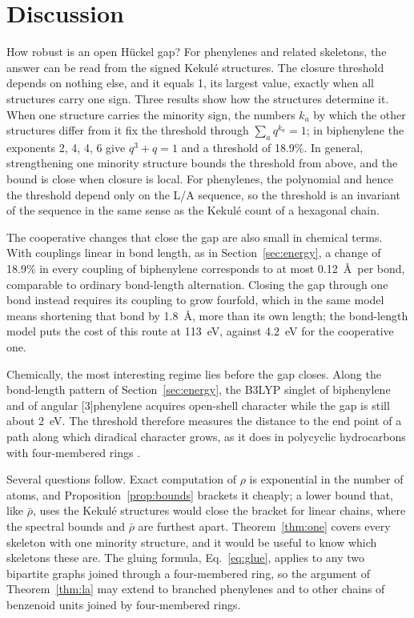 \documentclass[11pt]{article}
\begin{document}
\section{Discussion}

How robust is an open H\"uckel gap? For phenylenes and related skeletons, the answer can be read from the signed Kekul\'e structures. The closure threshold depends on nothing else, and it equals 1, its largest value, exactly when all structures carry one sign. Three results show how the structures determine it. When one structure carries the minority sign, the numbers $k_a$ by which the other structures differ from it fix the threshold through $\sum_aq^{k_a}=1$; in biphenylene the exponents 2, 4, 4, 6 give $q^3+q=1$ and a threshold of 18.9\%. In general, strengthening one minority structure bounds the threshold from above, and the bound is close when closure is local. For phenylenes, the polynomial and hence the threshold depend only on the L/A sequence, so the threshold is an invariant of the sequence in the same sense as the Kekul\'e count of a hexagonal chain.

The cooperative changes that close the gap are also small in chemical terms. With couplings linear in bond length, as in Section~\ref{sec:energy}, a change of 18.9\% in every coupling of biphenylene corresponds to at most 0.12~\AA\ per bond, comparable to ordinary bond-length alternation. Closing the gap through one bond instead requires its coupling to grow fourfold, which in the same model means shortening that bond by 1.8~\AA, more than its own length; the bond-length model puts the cost of this route at 113~eV, against 4.2~eV for the cooperative one.

Chemically, the most interesting regime lies before the gap closes. Along the bond-length pattern of Section~\ref{sec:energy}, the B3LYP singlet of biphenylene and of angular [3]phenylene acquires open-shell character while the gap is still about 2~eV. The threshold therefore measures the distance to the end point of a path along which diradical character grows, as it does in polycyclic hydrocarbons with four-membered rings \citep{MolesQuintero2022}.

Several questions follow. Exact computation of $\rho$ is exponential in the number of atoms, and Proposition~\ref{prop:bounds} brackets it cheaply; a lower bound that, like $\bar\rho$, uses the Kekul\'e structures would close the bracket for linear chains, where the spectral bounds and $\bar\rho$ are furthest apart. Theorem~\ref{thm:one} covers every skeleton with one minority structure, and it would be useful to know which skeletons these are. The gluing formula, Eq.~\eqref{eq:glue}, applies to any two bipartite graphs joined through a four-membered ring, so the argument of Theorem~\ref{thm:la} may extend to branched phenylenes and to other chains of benzenoid units joined by four-membered rings.
\end{document}
